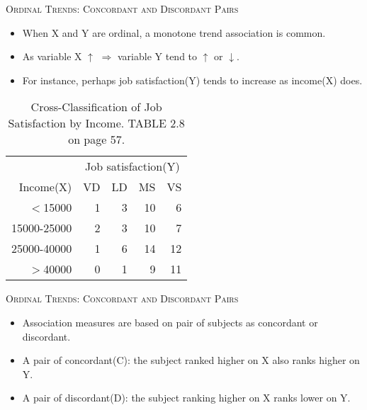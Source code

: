 \documentclass[dvipdfmx, serif,handout]{beamer}
\begin{document}
\begin{frame}{\textsc{Ordinal Trends: Concordant and Discordant Pairs}}

\begin{itemize}
\item When X and Y are ordinal, a monotone trend association is common. 
\item As variable X $\uparrow$ $\Rightarrow$ variable Y tend to $\uparrow$ or $\downarrow$.
\item For instance, perhaps job satisfaction(Y) tends to increase as income(X) does. 
\end{itemize}

{\scriptsize
\begin{table} %
\begin{tabular}{rrrrr}
  \hline
 & \multicolumn{4}{c}{Job satisfaction(Y)}\\ 
Income(X) & VD & LD & MS & VS \\ 
  \hline
$<$15000 & 1 & 3 & 10 & 6 \\ 
  15000-25000 & 2 & 3 & 10 & 7 \\ 
  25000-40000 & 1 & 6 & 14 & 12 \\ 
  $>$40000 & 0 & 1 & 9 & 11 \\ 
   \hline
\end{tabular}
\caption{\scriptsize Cross-Classification of Job Satisfaction by Income. TABLE 2.8 on page 57.}
\end{table}
}

\end{frame}
\begin{frame}{\textsc{Ordinal Trends: Concordant and Discordant Pairs}}

\begin{itemize}
\item Association  measures are based on pair of subjects as concordant or discordant. 
\item A pair of concordant(C): the subject ranked higher on X also ranks higher on Y. 

\item A pair of discordant(D): the subject ranking higher on X ranks lower on Y. 


\end{itemize}

\end{frame}
\end{document}
